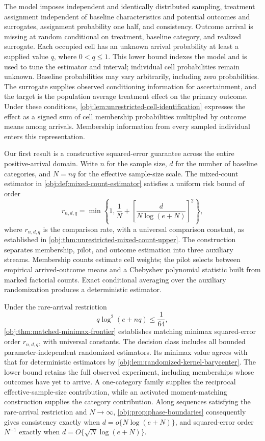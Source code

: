The model imposes independent and identically distributed sampling, treatment assignment independent of baseline characteristics and potential outcomes and surrogates, assignment probability one half, and consistency. Outcome arrival is missing at random conditional on treatment, baseline category, and realized surrogate. Each occupied cell has an unknown arrival probability at least a supplied value \(q\), where \(0<q\le1\). This lower bound indexes the model and is used to tune the estimator and interval; individual cell probabilities remain unknown. Baseline probabilities may vary arbitrarily, including zero probabilities. The surrogate supplies observed conditioning information for ascertainment, and the target is the population average treatment effect on the primary outcome. Under these conditions, \cref{obj:lem:unrestricted-cell-identification} expresses the effect as a signed sum of cell membership probabilities multiplied by outcome means among arrivals. Membership information from every sampled individual enters this representation.

Our first result is a constructive squared-error guarantee across the entire positive-arrival domain. Write \(n\) for the sample size, \(d\) for the number of baseline categories, and \(N=nq\) for the effective sample-size scale. The mixed-count estimator in \cref{obj:def:mixed-count-estimator} satisfies a uniform risk bound of order
\[
r_{n,d,q}
=
\min\left\{1,\frac1N+
\left[\frac{d}{N\log(e+N)}\right]^2\right\},
\]
where \(r_{n,d,q}\) is the comparison rate, with a universal comparison constant, as established in \cref{obj:thm:unrestricted-mixed-count-upper}. The construction separates membership, pilot, and outcome estimation into three auxiliary streams. Membership counts estimate cell weights; the pilot selects between empirical arrived-outcome means and a Chebyshev polynomial statistic built from marked factorial counts. Exact conditional averaging over the auxiliary randomization produces a deterministic estimator.

Under the rare-arrival restriction
\[
q\log^2(e+nq)\le\frac1{64},
\]
\cref{obj:thm:matched-minimax-frontier} establishes matching minimax squared-error order \(r_{n,d,q}\), with universal constants. The decision class includes all bounded parameter-independent randomized estimators. Its minimax value agrees with that for deterministic estimators by \cref{obj:lem:randomized-kernel-barycenter}. The lower bound retains the full observed experiment, including memberships whose outcomes have yet to arrive. A one-category family supplies the reciprocal effective-sample-size contribution, while an activated moment-matching construction supplies the category contribution. Along sequences satisfying the rare-arrival restriction and \(N\to\infty\), \cref{obj:prop:phase-boundaries} consequently gives consistency exactly when \(d=o\{N\log(e+N)\}\), and squared-error order \(N^{-1}\) exactly when \(d=O\{\sqrt N\log(e+N)\}\).

